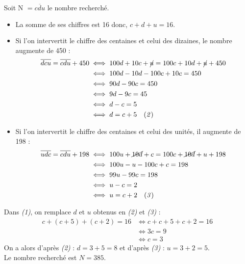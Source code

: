    Soit N $=\overline{cdu}$ le nombre recherché.
   \begin{itemize}
      \item La somme de ses chiffres est 16 donc, $c+d+u =16$.  \\
      \item Si l'on intervertit le chiffre des centaines et celui des dizaines, le nombre augmente de 450 :
      \begin{align*}
         \overline{dcu} =\overline{cdu}+450 & \iff 100d+10c+\cancel{u} =100c+10d+\cancel{u}+450 \\
         & \iff 100d-10d-100c+10c =450 \\
         & \iff 90d-90c=450 \\
         & \iff 9d-9c =45 \\
         & \iff d-c =5 \\
         & \iff d=c+5 \quad {\it (2)}
      \end{align*}
   \end{itemize}

\Coupe

   \begin{itemize}
      \item Si l'on intervertit le chiffre des centaines et celui des unités, il augmente de 198 :
      \begin{align*}
         \overline{udc} =\overline{cdu}+198 & \iff 100u+\cancel{10d}+c =100c+\cancel{10d}+u+198 \\
         & \iff 100u-u-100c+c =198 \\
         & \iff 99u-99c =198 \\
         & \iff u-c =2 \\
         & \iff u =c+2 \quad {\it (3)}
      \end{align*}
   \end{itemize}
   Dans {\it (1)}, on remplace $d$ et $u$ obtenus en {\it (2)} et {\it (3)} :
   \begin{align*}
   c+(c+5)+(c+2)=16 & \Longleftrightarrow c+c+5+c+2=16 \\
   & \Longleftrightarrow 3c=9 \\
   & \Longleftrightarrow c=3
   \end{align*}
   On a alors d'après {\it (2)} : $d=3+5=8$ et d'après {\it (3)} : $u=3+2=5$. \\
   Le nombre recherché est {\blue $N = 385$}. \\
